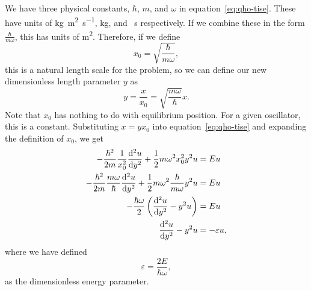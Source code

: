 \documentclass[../quantum_mechanics.tex]{subfiles}
\begin{document}
            We have three physical constants, $\hbar$, $m$, and $\omega$ in equation~\ref{eq:qho-tise}.
            These have units of \unit{\kilogram\meter\squared\per\second}, \unit{\kilogram}, and \unit{\per\second} respectively.
            If we combine these in the form $\frac{\hbar}{m\omega}$, this has units of \unit{\meter\squared}.
            Therefore, if we define
            \begin{equation}
                x_0=\sqrt{\frac{\hbar}{m\omega}},
            \end{equation}
            this is a natural length scale for the problem, so we can define our new dimensionless length parameter $y$ as
            \begin{equation}
                y=\frac{x}{x_0}=\sqrt{\frac{m\omega}{\hbar}}x.
            \end{equation}
            Note that $x_0$ has nothing to do with equilibrium position.
            For a given oscillator, this is a constant.
            Substituting $x=yx_0$ into equation~\ref{eq:qho-tise} and expanding the definition of $x_0$, we get
            \begin{align}
                -\frac{\hbar^2}{2m}\frac{1}{x_0^2}\dv[2]{u}{y}+\frac{1}{2}m\omega^2x_0^2y^2u&=Eu\\
                -\frac{\hbar^2}{2m}\frac{m\omega}{\hbar}\dv[2]{u}{y}+\frac{1}{2}m\omega^2\frac{\hbar}{m\omega}y^2u&=Eu\\
                -\frac{\hbar\omega}{2}\left(\dv[2]{u}{y}-y^2u\right)&=Eu\\
                \dv[2]{u}{y}-y^2u&=-\varepsilon u,\label{eq:qho-tise-dimensionless}
            \end{align}
            where we have defined
            \begin{equation}
                \varepsilon=\frac{2E}{\hbar\omega},
            \end{equation}
            as the dimensionless energy parameter.
\end{document}
